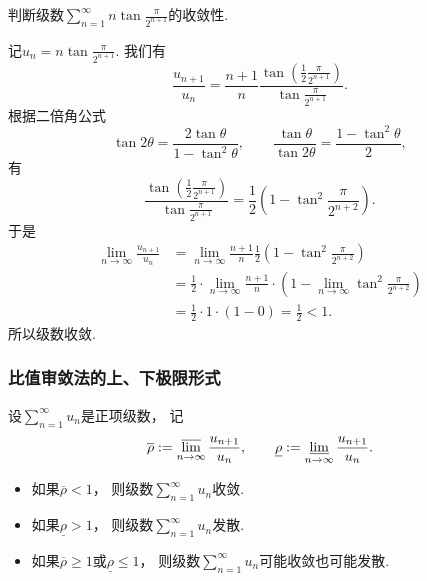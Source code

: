 \begin{example}
判断级数\(\sum_{n=1}^\infty n \tan\frac{\pi}{2^{n+1}}\)的收敛性.
\begin{solution}
记\(u_n = n \tan\frac{\pi}{2^{n+1}}\).
我们有\[
	\frac{u_{n+1}}{u_n}
	= \frac{n+1}{n} \frac{\tan(\frac{1}{2}\frac{\pi}{2^{n+1}})}{\tan\frac{\pi}{2^{n+1}}}.
\]
根据二倍角公式\[
	\tan2\theta = \frac{2\tan\theta}{1-\tan^2\theta},
	\qquad
	\frac{\tan\theta}{\tan2\theta} = \frac{1-\tan^2\theta}{2},
\]
有\[
	\frac{\tan(\frac{1}{2}\frac{\pi}{2^{n+1}})}{\tan\frac{\pi}{2^{n+1}}}
	= \frac{1}{2} \left(
		1-\tan^2\frac{\pi}{2^{n+2}}
	\right).
\]
于是\begin{align*}
	\lim_{n\to\infty} \frac{u_{n+1}}{u_n}
	&= \lim_{n\to\infty} \frac{n+1}{n} \frac{1}{2} \left(
		1-\tan^2\frac{\pi}{2^{n+2}}
	\right) \\
	&= \frac{1}{2} \cdot \lim_{n\to\infty} \frac{n+1}{n} \cdot \left(
		1 - \lim_{n\to\infty} \tan^2\frac{\pi}{2^{n+2}}
	\right) \\
	&= \frac{1}{2} \cdot 1 \cdot (1 - 0) = \frac{1}{2} < 1.
\end{align*}
所以级数收敛.
\end{solution}
\end{example}

\subsubsection{比值审敛法的上、下极限形式}
\begin{corollary}\label{theorem:无穷级数.正项级数的比值审敛法的上下极限形式}
\def\orho{\overline{\rho}}
\def\urho{\underline{\rho}}
设\(\sum_{n=1}^\infty u_n\)是正项级数，
记\[
	\orho
	\defeq
	\varlimsup_{n\to\infty} \frac{u_{n+1}}{u_n},
	\qquad
	\urho
	\defeq
	\varliminf_{n\to\infty} \frac{u_{n+1}}{u_n}.
\]
\begin{itemize}
	\item 如果\(\orho < 1\)，
	则级数\(\sum_{n=1}^\infty u_n\)收敛.

	\item 如果\(\urho > 1\)，
	则级数\(\sum_{n=1}^\infty u_n\)发散.

	\item 如果\(\orho \geq 1\)或\(\urho \leq 1\)，
	则级数\(\sum_{n=1}^\infty u_n\)可能收敛也可能发散.
\end{itemize}
\end{corollary}

